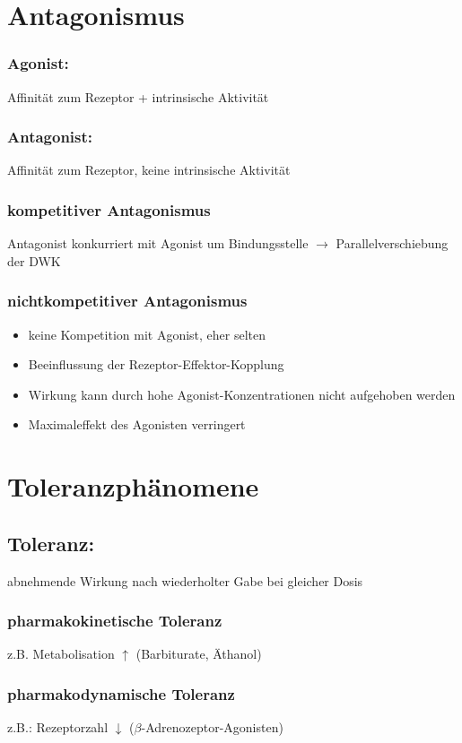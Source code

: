 \documentclass[10pt,a4paper]{report}
\begin{document}
\section{Antagonismus}
\subsubsection{Agonist:}Affinität zum Rezeptor
+ intrinsische Aktivität
\subsubsection{Antagonist:} Affinität zum Rezeptor, 
keine intrinsische Aktivität
\subsubsection{kompetitiver Antagonismus} Antagonist konkurriert mit Agonist um 
Bindungsstelle $\rightarrow$ Parallelverschiebung der DWK
\subsubsection{nichtkompetitiver Antagonismus}
\begin{itemize}
	\item keine Kompetition mit Agonist, eher selten
	\item Beeinflussung der Rezeptor-Effektor-Kopplung
	\item Wirkung kann durch hohe Agonist-Konzentrationen nicht aufgehoben werden
	\item Maximaleffekt des Agonisten	verringert
\end{itemize}
\section{Toleranzphänomene}
\subsection{Toleranz:} abnehmende Wirkung nach wiederholter Gabe bei gleicher Dosis
\subsubsection{pharmakokinetische Toleranz} z.B. Metabolisation $\uparrow$ (Barbiturate, Äthanol)
\subsubsection{pharmakodynamische Toleranz} z.B.: Rezeptorzahl $\downarrow$ ($\beta$-Adrenozeptor-Agonisten)
\end{document}

